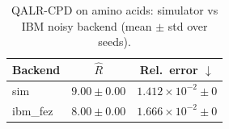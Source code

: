 \begin{table}[t]
\centering
\caption{QALR-CPD on amino acids: simulator vs IBM noisy backend (mean $\pm$ std over seeds).}
\label{tab:ablation_ibm}
\begin{tabular}{@{}lcc@{}}
\toprule
Backend & \(\hat R\) & Rel.\ error \(\downarrow\) \\
\midrule
sim & \(9.00 \pm 0.00\) & \(1.412{\times}10^{-2} \pm 0\) \\
ibm_fez & \(8.00 \pm 0.00\) & \(1.666{\times}10^{-2} \pm 0\) \\
\bottomrule
\end{tabular}
\end{table}